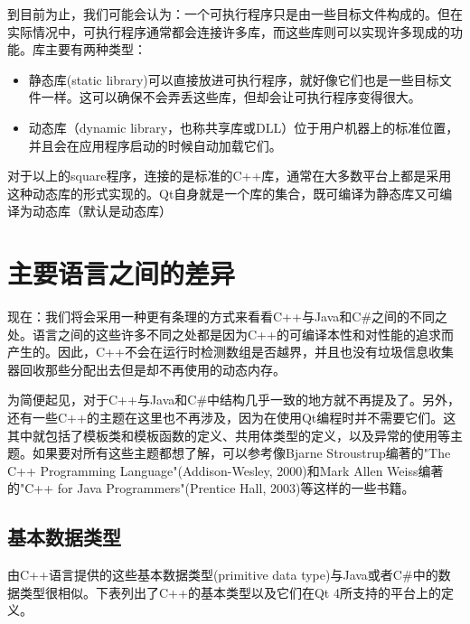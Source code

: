 \documentclass[11pt,oneside]{book}
\begin{document}
\begin{common-format}
到目前为止，我们可能会认为：一个可执行程序只是由一些目标文件构成的。但在实际情况中，可执行程序通常都会连接许多库，而这些库则可以实现许多现成的功能。库主要有两种类型：
\begin{itemize}
\item 静态库(static library)可以直接放进可执行程序，就好像它们也是一些目标文件一样。这可以确保不会弄丢这些库，但却会让可执行程序变得很大。
\item 动态库（dynamic library，也称共享库或DLL）位于用户机器上的标准位置，并且会在应用程序启动的时候自动加载它们。 
\end{itemize}

对于以上的square程序，连接的是标准的C++库，通常在大多数平台上都是采用这种动态库的形式实现的。Qt自身就是一个库的集合，既可编译为静态库又可编译为动态库（默认是动态库）


\section{主要语言之间的差异}
现在：我们将会采用一种更有条理的方式来看看C++与Java和C\#{}之间的不同之处。语言之间的这些许多不同之处都是因为C++的可编译本性和对性能的追求而产生的。因此，C++不会在运行时检测数组是否越界，并且也没有垃圾信息收集器回收那些分配出去但是却不再使用的动态内存。

为简便起见，对于C++与Java和C\#{}中结构几乎一致的地方就不再提及了。另外，还有一些C++的主题在这里也不再涉及，因为在使用Qt编程时并不需要它们。这其中就包括了模板类和模板函数的定义、共用体类型的定义，以及异常的使用等主题。如果要对所有这些主题都想了解，可以参考像Bjarne Stroustrup编著的"The C++ Programming Language"(Addison-Wesley, 2000)和Mark Allen Weiss编著的"C++ for Java Programmers"(Prentice Hall, 2003)等这样的一些书籍。

\subsection{基本数据类型}
由C++语言提供的这些基本数据类型(primitive data type)与Java或者C\#{}中的数据类型很相似。下表列出了C++的基本类型以及它们在Qt 4所支持的平台上的定义。


\end{common-format}
\end{document}
